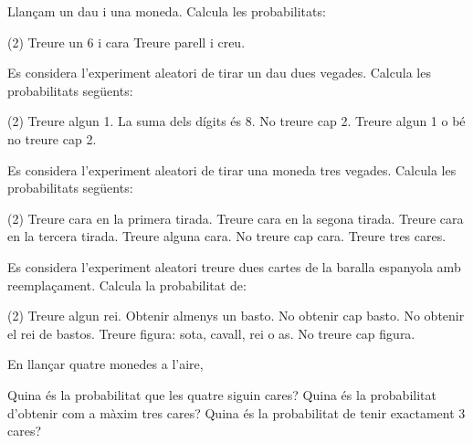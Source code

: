 \begin{mylist}
	

\exer Llançam un dau i una moneda. Calcula les probabilitats:
\begin{tasks}(2)
	\task  Treure un 6 i cara     
	\task  Treure parell i creu.
\end{tasks}
\answers{[$\frac{1}{6}\cdot \frac{1}{2}=\frac{1}{12}$, $\frac{3}{6}\cdot \frac{1}{2}=\frac{1}{4}$]}


\exer  Es considera l'experiment aleatori de tirar un dau dues vegades. Calcula les probabilitats següents:  
\begin{tasks}(2)
	\task  Treure algun 1.     
	\task  La suma dels dígits és 8. 
	\task  No treure cap 2.    
	\task  Treure algun 1 o bé no treure cap 2.
\end{tasks}
  
\exer[1]  Es considera l'experiment aleatori de tirar una moneda tres vegades. Calcula les probabilitats següents:  
\begin{tasks}(2) 
	\task  Treure cara en la primera tirada.   
	\task  Treure cara en la segona tirada.
	\task  Treure cara en la tercera tirada.  
	\task  Treure alguna cara. 
	\task  No treure cap cara.     
	\task  Treure tres cares. 
\end{tasks}
\answers[cols=3]{[$\frac{1}{2}$, $\frac{1}{2}$, $\frac{1}{2}$, $1-\dfrac{1}{8}=\dfrac{7}{8}$, $\frac{1}{8}$, $\frac{1}{8}$]}

 \exer[1]  Es considera l'experiment aleatori treure dues cartes de la baralla espanyola amb reemplaçament. Calcula la probabilitat de:  
 \begin{tasks}(2)
 	\task  Treure algun rei.        
 	\task  Obtenir almenys un basto. 
 	\task  No obtenir cap basto.       
 	\task  No obtenir el rei de bastos. 
 	\task  Treure figura: sota, cavall, rei o as.     
 	\task  No treure cap figura.
 \end{tasks}
 \answers[cols=3]{[0.19, 0.44, 0.56, 0.95, 0.65, 0.35]}

\newpage

\exer  En llançar quatre monedes a l'aire,  
\begin{tasks}
	\task  Quina és la probabilitat que les quatre siguin cares?
	\task  Quina és la probabilitat d'obtenir com a màxim tres cares? 
	\task  Quina és la probabilitat de tenir exactament 3 cares?
\end{tasks}
\answers[cols=1]{[$\left(\frac{1}{2}\right)^4= \frac{1}{16}$, $1-P(CCCC)=1-\frac{1}{16}=\frac{15}{16}$, $4 P(XCCC)=4\left(\frac{1}{2}\right)^4=\frac{1}{4}$]}
  


\end{mylist}

